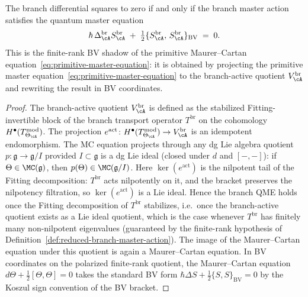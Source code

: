 \begin{proposition}
\label{prop:branch-master-equation}
\ClaimStatusProvedHere
{}
The branch differential squares to zero if and only if
the branch master action satisfies the quantum master equation
\begin{equation}
\label{eq:branch-qme}
\hbar\,\Delta_\cA^{\mathrm{br}} S_\cA^{\mathrm{br}}
\;+\;
\tfrac{1}{2}\{S_\cA^{\mathrm{br}},\,
S_\cA^{\mathrm{br}}\}_{\mathrm{BV}}
\;=\; 0.
\end{equation}
This is the finite-rank BV shadow of the primitive Maurer--Cartan
equation~\eqref{eq:primitive-master-equation}: it is obtained by
projecting the primitive master
equation~\eqref{eq:primitive-master-equation} to the branch-active quotient
$V_\cA^{\mathrm{br}}$ and rewriting the result in BV coordinates.
\end{proposition}

\begin{proof}
The branch-active quotient $V_\cA^{\mathrm{br}}$ is defined as
the stabilized Fitting-invertible block of the branch transport
operator $T^{\mathrm{br}}$ on the cohomology
$H^\bullet(T_{\Theta_\cA}^{\mathrm{mod}})$.  The projection
$e^{\mathrm{act}} \colon H^\bullet(T_{\Theta_\cA}^{\mathrm{mod}})
\to V_\cA^{\mathrm{br}}$
is an idempotent endomorphism.
The MC equation projects through any dg Lie algebra
quotient $p \colon \mathfrak{g} \to \mathfrak{g}/I$ provided
$I \subset \mathfrak{g}$ is a dg Lie ideal (closed under $d$
and $[-,-]$): if $\Theta \in \MC(\mathfrak{g})$, then
$p(\Theta) \in \MC(\mathfrak{g}/I)$.  Here
$\ker(e^{\mathrm{act}})$ is the nilpotent tail of the
Fitting decomposition: $T^{\mathrm{br}}$ acts nilpotently on
it, and the bracket preserves the nilpotency filtration, so
$\ker(e^{\mathrm{act}})$ is a Lie ideal.
Hence the branch QME holds once the Fitting
decomposition of $T^{\mathrm{br}}$ stabilizes, i.e.\ once
the branch-active quotient exists as a Lie ideal quotient, which
is the case whenever $T^{\mathrm{br}}$ has finitely many
non-nilpotent eigenvalues (guaranteed by the finite-rank
hypothesis of
Definition~\ref{def:reduced-branch-master-action}).
The image of the Maurer--Cartan equation under this quotient
is again a Maurer--Cartan equation.  In BV coordinates on the
polarized finite-rank quotient, the Maurer--Cartan equation
$d\Theta + \frac{1}{2}[\Theta,\Theta] = 0$ takes the standard
BV form $\hbar\Delta S + \frac{1}{2}\{S,S\}_{\mathrm{BV}} = 0$
by the Koszul sign convention of the BV bracket.
\end{proof}


